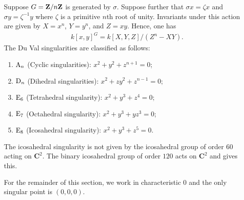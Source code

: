 \documentclass[11pt, oneside,margin=1in]{article}
\begin{document}
Suppose $G=\mathbf Z / n\mathbf Z$ is generated by $\sigma$. Suppose further that $\sigma x = \zeta x$ and $\sigma y =\zeta^{-1}y$ where $\zeta$ is a primitive $n$th root of unity. Invariants under this action are given by $X =x^n$, $Y=y^n$, and $Z=xy$. Hence, one has
\begin{align*}
	k[x,y]^G = k[X,Y,Z] / (Z^n- XY).
\end{align*}
The Du Val singularities are classified as follows:
\begin{enumerate}
	\item $\operatorname{A}_n$ (Cyclic singularities): $x^2+y^2+z^{n+1}=0$;
	\item $\operatorname{D}_n$ (Dihedral singularities): $x^2+zy^2+z^{n-1}=0$;
	\item $\operatorname{E}_6$ (Tetrahedral singularity): $x^2+y^3+z^4=0$;
	\item $\operatorname{E}_7$ (Octahedral singularity): $x^2+y^3+yz^3=0$;
	\item $\operatorname{E}_8$ (Icosahedral singularity): $x^2+y^3+z^5=0$.
\end{enumerate}
The icosahedral singularity is not given by the icosahedral group of order $60$ acting on $\mathbf{C}^2$. The binary icosahedral group of order $120$ acts on $\mathbf{C}^2$ and gives this. 
\begin{remark}
	For the remainder of this section, we work in characteristic $0$ and the only singular point is $(0,0,0)$.
\end{remark}
\end{document}
